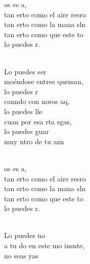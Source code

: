 \documentclass[12pt]{article}
\begin{document}
\begin{multicols*}{2}
\begin{cancion}%
	\begin{chorus}%
	os es a, \\
	tan erto como el aire  resro\\
	tan erto como la mana sln\\
	tan erto como que este to \\
	lo puedes r. \\
	\end{chorus}%
	\jump\\
	Lo puedes ser\\
	moéndose entres queman,\\
	lo puedes r\\
	canndo con noros aq, \\
	lo puedes lle\\
	cuan por esa rta sgas,\\
	lo puedes guar\\
	muy ntro de tu azn\\\jump\\
	\begin{chorus}%
	os es a, \\
	tan erto como el aire  resro\\
	tan erto como la mana sln\\
	tan erto como que este to \\
	lo puedes r. \\
	\end{chorus}%
	\jump\\
	Lo puedes no\\
	a tu do en este mo insnte,\\
	no seas yas \\

\end{cancion}
\end{multicols*}
\end{document}
